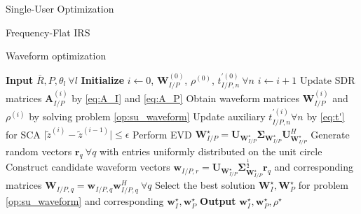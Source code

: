 \documentclass{IEEEtran}
\begin{document}
\begin{section}{Single-User Optimization}
\begin{subsection}{Frequency-Flat IRS}
\begin{subsubsection}{Waveform optimization}
			\begin{algorithm}
				\caption{Waveform Optimization}
				\label{alg:waveform}
				\begin{algorithmic}[1]
					\State \textbf{Input} $\bar{R},P,\theta_l \ \forall l$
					\State \textbf{Initialize} $i \leftarrow 0$, $\boldsymbol{W}_{I/P}^{(0)}$, $\rho^{(0)}$, $t_{I/P,n}^{\prime (0)} \ \forall n$
					\Repeat
					\State $i \leftarrow i + 1$
					\State Update SDR matrices $\boldsymbol{A}_{I/P}^{(i)}$ by \ref{eq:A_I} and \ref{eq:A_P}
					\State Obtain waveform matrices $\boldsymbol{W}_{I/P}^{(i)}$ and $\rho^{(i)}$ by solving problem \ref{op:su_waveform}
					\State Update auxiliary $t_{I/P,n}^{\prime (i)} \forall n$ by \ref{eq:t'} for SCA
					\Until $\lvert \tilde{z}^{(i)}-\tilde{z}^{(i-1)} \rvert \le \epsilon$
					\State Perform EVD $\boldsymbol{W}_{I/P}^{\star}=\boldsymbol{U}_{\boldsymbol{W}_{I/P}^{\star}}\boldsymbol{\Sigma}_{\boldsymbol{W}_{I/P}^{\star}}\boldsymbol{U}_{\boldsymbol{W}_{I/P}^{\star}}^H$
					\State Generate random vectors $\boldsymbol{r}_q \ \forall q$ with entries uniformly distributed on the unit circle
					\State Construct candidate waveform vectors $\boldsymbol{w}_{I/P,r}=\boldsymbol{U}_{\boldsymbol{W}_{I/P}^{\star}}\boldsymbol{\Sigma}_{\boldsymbol{W}_{I/P}^{\star}}^{\frac{1}{2}}\boldsymbol{r}_q$ and corresponding matrices $\boldsymbol{W}_{I/P,q}=\boldsymbol{w}_{I/P,q}\boldsymbol{w}_{I/P,q}^H  \ \forall q$
					\State Select the best solution $\boldsymbol{W}_{I}^\star,\boldsymbol{W}_{P}^\star$ for problem \ref{op:su_waveform} and corresponding $\boldsymbol{w}_{I}^\star, \boldsymbol{w}_{P}^\star$
					\State \textbf{Output} $\boldsymbol{w}_I^\star, \boldsymbol{w}_P^\star, \rho^\star$
				\end{algorithmic}
			\end{algorithm}
		\end{subsubsection}
	\end{subsection}
\end{section}



\end{document}
